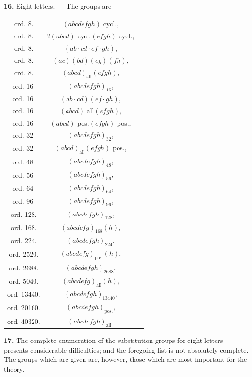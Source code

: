 \documentclass[11pt,a4paper]{book}
\begin{document}
\vspace{0.5em}
\textbf{16.} Eight letters. --- The groups are
\begin{center}
\begin{tabular}{ccl}
ord.  8. & $(abcdefgh)$ cycl., \\
ord.  8. & $2(abcd)$ cycl.$(efgh)$ cycl., \\
ord.  8. & $(ab \cdot cd \cdot ef \cdot gh)$, \\
ord.  8. & $(ac)(bd)(eg)(fh)$, \\
ord.  8. & $(abcd)_{\text{all}}(efgh)$, \\
ord.  16. & $(abcdefgh)_{16}$, \\
ord.  16. & $(ab \cdot cd)(ef \cdot gh)$, \\
ord.  16. & $(abcd)$ all$(efgh)$, \\
ord.  16. & $(abcd)$ pos.$(efgh)$ pos., \\
ord.  32. & $(abcdefgh)_{32}$, \\
ord.  32. & $(abcd)_{\text{all}}(efgh)$ pos., \\
ord.  48. & $(abcdefgh)_{48}$, \\
ord.  56. & $(abcdefgh)_{56}$, \\
ord.  64. & $(abcdefgh)_{64}$, \\
ord.  96. & $(abcdefgh)_{96}$, \\
ord.  128. & $(abcdefgh)_{128}$, \\
ord.  168. & $(abcdefg)_{168}(h)$, \\
ord.  224. & $(abcdefgh)_{224}$, \\
ord.  2520. & $(abcdefg)_{\text{pos.}}(h)$, \\
ord.  2688. & $(abcdefgh)_{2688}$, \\
ord.  5040. & $(abcdefg)_{\text{all}}(h)$, \\
ord.  13440. & $(abcdefgh)_{13440}$, \\
ord.  20160. & $(abcdefgh)_{\text{pos.}}$, \\
ord.  40320. & $(abcdefgh)_{\text{all}}$.
\end{tabular}
\end{center}

\vspace{0.5em}
\textbf{17.} The complete enumeration of the substitution groups for eight letters presents considerable difficulties; and the foregoing list is not absolutely complete. The groups which are given are, however, those which are most important for the theory.
\clearpage
\end{document}

